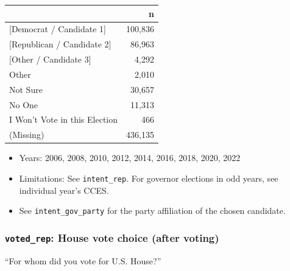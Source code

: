 \documentclass[10pt,article,oneside]{memoir}
\theoremstyle{definition}
\begin{document}
\begin{table}[H]
\centering
\begin{tabular}[t]{lr}
\toprule
 & n\\
\midrule
{}{[Democrat / Candidate 1]} & 100,836\\
{}{[Republican / Candidate 2]} & 86,963\\
{}{[Other / Candidate 3]} & 4,292\\
Other & 2,010\\
Not Sure & 30,657\\
No One & 11,313\\
I Won't Vote in this Election & 466\\
(Missing) & 436,135\\
\bottomrule
\end{tabular}
\end{table}

\begin{itemize}
\tightlist
\item
  Years: 2006, 2008, 2010, 2012, 2014, 2016, 2018, 2020, 2022
\item
  Limitations: See \texttt{intent\_rep}. For governor elections in odd
  years, see individual year's CCES.
\item
  See \texttt{intent\_gov\_party} for the party affiliation of the
  chosen candidate.
\end{itemize}

\subsubsection{\texorpdfstring{\texttt{voted\_rep}: House vote choice
(after
voting)}{voted\_rep: House vote choice (after voting)}}\label{voted_rep-house-vote-choice-after-voting}

``For whom did you vote for U.S. House?''
\end{document}
